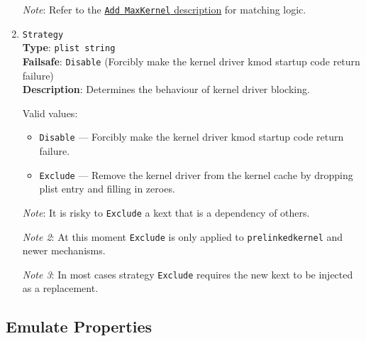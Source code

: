 \documentclass[]{article}
\makeatletter
\providecommand{\tightlist}{%
  \setlength{\itemsep}{0pt}\setlength{\parskip}{0pt}}
\renewcommand{\label}[1]{%
\zref@wrapper@immediate{\oldlabel{#1}}}  %
\makeatother
\begin{document}
\begin{enumerate}
  \emph{Note}: Refer to the \hyperlink{kernmatch}{\texttt{Add\ MaxKernel} description} for matching logic.

\item
  \texttt{Strategy}\\
  \textbf{Type}: \texttt{plist\ string}\\
  \textbf{Failsafe}: \texttt{Disable} (Forcibly make the kernel driver kmod startup code return failure)\\
  \textbf{Description}: Determines the behaviour of kernel driver blocking.

  Valid values:

  \begin{itemize}
    \tightlist
    \item \texttt{Disable} --- Forcibly make the kernel driver kmod startup code return failure.
    \item \texttt{Exclude} --- Remove the kernel driver from the kernel cache by dropping plist entry and filling in zeroes.
  \end{itemize}

  \emph{Note}: It is risky to \texttt{Exclude} a kext that is a dependency of others.

  \emph{Note 2}: At this moment \texttt{Exclude} is only applied to \texttt{prelinkedkernel} and newer mechanisms.

  \emph{Note 3}: In most cases strategy \texttt{Exclude} requires the new kext to be injected as a replacement.

\end{enumerate}

\subsection{Emulate Properties}\label{kernelpropsemu}
\end{document}
